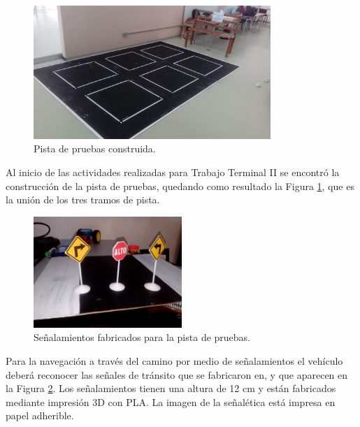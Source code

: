 \begin{figure}[htbp!]
	\centering
	\includegraphics[width=0.8\textwidth]{./Figuras/PistaC}
	\caption{Pista de pruebas construida.}
	\label{fig:pista}
\end{figure}
\par Al inicio de las actividades realizadas para Trabajo Terminal II se encontró la construcción de la pista de pruebas, quedando como resultado la Figura \ref{fig:pista}, que es la unión de los tres tramos de pista.
\begin{figure}[htbp!]
	\centering
	\includegraphics[width=0.5\textwidth]{./Figuras/Senales}
	\caption{Señalamientos fabricados para la pista de pruebas.}
	\label{fig:Sen}
\end{figure}
\par Para la navegación a través del camino por medio de señalamientos el vehículo deberá reconocer las señales de tránsito que se fabricaron en, y que aparecen en la Figura \ref{fig:Sen}. Los señalamientos tienen una altura de 12 cm y están fabricados mediante impresión 3D con PLA. La imagen de la señalética está impresa en papel adherible.
